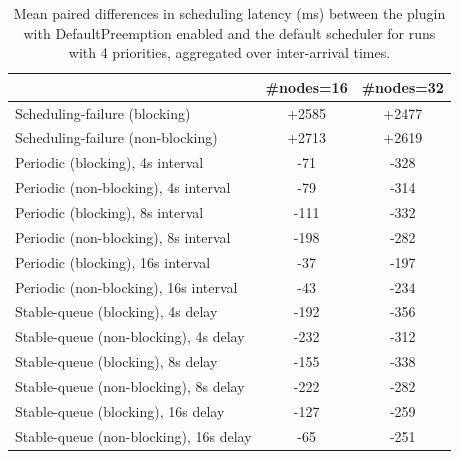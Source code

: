 \begin{table}[t]
\tiny
\setlength{\tabcolsep}{1.2pt}
\renewcommand{\arraystretch}{1.12}
\centering
\caption{Mean paired differences in scheduling latency (ms) between the plugin with DefaultPreemption enabled and the default scheduler for runs with 4 priorities, aggregated over inter-arrival times.}
\label{tab:latency-defpreempt1-prio4-std0-agg-arrival}
\begin{tabular}{l c c}
\toprule
 & \#nodes=16 & \#nodes=32 \\
\midrule
Scheduling-failure (blocking) & +2585 & +2477 \\
Scheduling-failure (non-blocking) & +2713 & +2619 \\
Periodic (blocking), 4s interval & -71 & -328 \\
Periodic (non-blocking), 4s interval & -79 & -314 \\
Periodic (blocking), 8s interval & -111 & -332 \\
Periodic (non-blocking), 8s interval & -198 & -282 \\
Periodic (blocking), 16s interval & -37 & -197 \\
Periodic (non-blocking), 16s interval & -43 & -234 \\
Stable-queue (blocking), 4s delay & -192 & -356 \\
Stable-queue (non-blocking), 4s delay & -232 & -312 \\
Stable-queue (blocking), 8s delay & -155 & -338 \\
Stable-queue (non-blocking), 8s delay & -222 & -282 \\
Stable-queue (blocking), 16s delay & -127 & -259 \\
Stable-queue (non-blocking), 16s delay & -65 & -251 \\
\bottomrule
\end{tabular}
\end{table}
